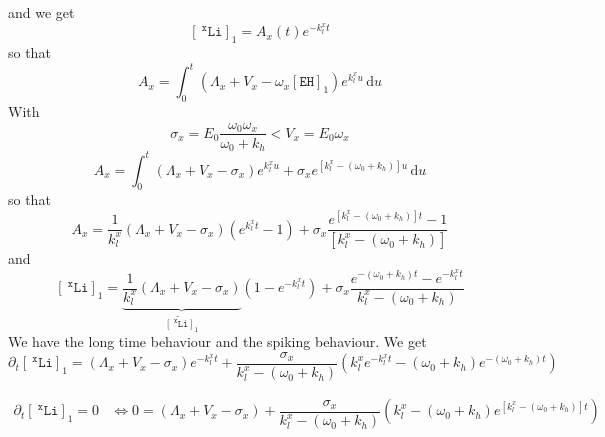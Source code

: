 \documentclass[aps,onecolumn,11pt]{revtex4}
\newcommand{\mychem}[1]{\mathtt{#1}}
\newcommand{\myconc}[1]{\left\lbrack{#1}\right\rbrack}
\newcommand{\spLi}[1]{{~^{\mychem{#1}}\mychem{Li}}}
\newcommand{\Li}[1]{\myconc{\spLi{#1}}}
\newcommand{\spEHin}{\mychem{EH}}
\newcommand{\EHin}{\myconc{\spEHin}}
\begin{document}
and we get 
\begin{equation}
	\Li{x}_1 = A_x(t) e^{-k_l^x t } 
\end{equation}
so that
\begin{equation}
	A_x = \int_0^t \left(\Lambda_x + V_x - \omega_x  \EHin_1 \right) e^{k_l^x u }\,\mathrm{d}u
\end{equation}
With 
\begin{equation}
	\sigma_x = E_0 \dfrac{\omega_0\omega_x}{\omega_0+k_h} < V_x = E_0 \omega_x
\end{equation}
\begin{equation}
	A_x = \int_0^t 
		\left(\Lambda_x + V_x - \sigma_x \right) e^{k_l^x u } 
		+ \sigma_x e^{\left\lbrack k_l^x  - \left(\omega_0+k_h\right) \right\rbrack u}
	\,\mathrm{d}u
\end{equation}
so that
\begin{equation}
	A_x = \dfrac{1}{k_l^x}\left(\Lambda_x + V_x - \sigma_x \right)\left(e^{k_l^x t}-1\right)
	+ \sigma_x \dfrac{
	e^{\left\lbrack k_l^x  - \left(\omega_0+k_h\right) \right\rbrack t} - 1
	}{\left\lbrack k_l^x  - \left(\omega_0+k_h\right) \right\rbrack}
\end{equation}
and
\begin{equation}
	\Li{x}_1 = \underbrace{\dfrac{1}{k_l^x}\left(\Lambda_x + V_x - \sigma_x \right)}_{\widetilde{\Li{x}}_1}\left(1-e^{-k_l^x t}\right)
	+\sigma_x \dfrac{
	e^{- \left(\omega_0+k_h\right)  t} - e^{-k_l^x t}
	}{ k_l^x  - \left(\omega_0+k_h\right) }
\end{equation}
We have the long time behaviour and the spiking behaviour.
We get
\begin{equation}
	\partial_t \Li{x}_1 = \left(\Lambda_x + V_x - \sigma_x \right) e^{-k_l^x t }
	+ \dfrac{\sigma_x}{k_l^x  - \left(\omega_0+k_h\right)}
	\left(k_l^x e^{-k_l^x t} - \left(\omega_0+k_h\right) e^{- \left(\omega_0+k_h\right)  t}\right)
\end{equation}

\begin{equation}
	\begin{array}{rl}
	\partial_t \Li{x}_1 = 0 & \Leftrightarrow 0=\left(\Lambda_x + V_x - \sigma_x \right) 
	+ \dfrac{\sigma_x}{k_l^x  - \left(\omega_0+k_h\right)}
	\left(k_l^x   - \left(\omega_0+k_h\right) e^{ \left\lbrack k_l^x - \left(\omega_0+k_h\right)\right\rbrack  t}\right)\\
	\end{array}
\end{equation}
\end{document}
